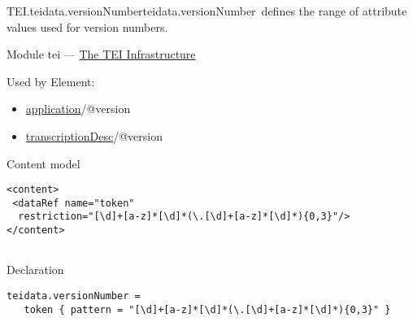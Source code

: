 \begin{reflist}
\item[]\begin{specHead}{TEI.teidata.versionNumber}{teidata.versionNumber} defines the range of attribute values used for version numbers.\end{specHead} 
    \item[{Module}]
  tei — \hyperref[ST]{The TEI Infrastructure}
    \item[{Used by}]
  Element: \begin{itemize}
\item \hyperref[TEI.application]{application}/@version
\item \hyperref[TEI.transcriptionDesc]{transcriptionDesc}/@version
\end{itemize} 
    \item[{Content model}]
  \mbox{}\hfill\\[-10pt]\begin{Verbatim}[fontsize=\small]
<content>
 <dataRef name="token"
  restriction="[\d]+[a-z]*[\d]*(\.[\d]+[a-z]*[\d]*){0,3}"/>
</content>
    
\end{Verbatim}

    \item[{Declaration}]
  \mbox{}\hfill\\[-10pt]\begin{Verbatim}[fontsize=\small]
teidata.versionNumber =
   token { pattern = "[\d]+[a-z]*[\d]*(\.[\d]+[a-z]*[\d]*){0,3}" }
\end{Verbatim}

\end{reflist}  
